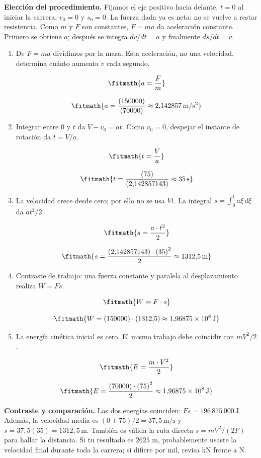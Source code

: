 \noindent\textbf{Elección del procedimiento.} Fijamos el eje positivo hacia delante, $t=0$ al iniciar la carrera, $v_0=0$ y $s_0=0$. La fuerza dada ya es neta: no se vuelve a restar resistencia. Como $m$ y $F$ son constantes, $F=ma$ da aceleración constante. Primero se obtiene $a$; después se integra $dv/dt=a$ y finalmente $ds/dt=v$.

\begin{enumerate}

\item De $F=ma$ dividimos por la masa. Esta aceleración, no una velocidad, determina cuánto aumenta $v$ cada segundo.

\[\fitmath{a=\frac{F}{m}}\]

\[\fitmath{a=\frac{(150000)}{(70000)}\approx 2{,}142857\,\mathrm{m/s^{2}}}\]

\item Integrar entre $0$ y $t$ da $V-v_0=at$. Como $v_0=0$, despejar el instante de rotación da $t=V/a$.

\[\fitmath{t=\frac{V}{a}}\]

\[\fitmath{t=\frac{(75)}{(2{,}142857143)}\approx 35\,\mathrm{s}}\]

\item La velocidad crece desde cero; por ello no se usa $Vt$. La integral $s=\int_0^t a\xi\,d\xi$ da $at^2/2$.

\[\fitmath{s=\frac{a\cdot {t}^{2}}{2}}\]

\[\fitmath{s=\frac{(2{,}142857143)\cdot {(35)}^{2}}{2}\approx 1312{,}5\,\mathrm{m}}\]

\item Contraste de trabajo: una fuerza constante y paralela al desplazamiento realiza $W=Fs$.

\[\fitmath{W=F\cdot s}\]

\[\fitmath{W=(150000)\cdot (1312{,}5)\approx 1{,}96875\times10^{8}\,\mathrm{J}}\]

\item La energía cinética inicial es cero. El mismo trabajo debe coincidir con $mV^2/2$.

\[\fitmath{E=\frac{m\cdot {V}^{2}}{2}}\]

\[\fitmath{E=\frac{(70000)\cdot {(75)}^{2}}{2}\approx 1{,}96875\times10^{8}\,\mathrm{J}}\]

\end{enumerate}

\noindent\textbf{Contraste y comparación.} Las dos energías coinciden: $Fs=196\,875\,000\,\mathrm{J}$. Además, la velocidad media es $(0+75)/2=37{,}5\,\mathrm{m/s}$ y $s=37{,}5(35)=1312{,}5\,\mathrm m$. También es válida la ruta directa $s=mV^2/(2F)$ para hallar la distancia. Si tu resultado es $2625$ m, probablemente usaste la velocidad final durante toda la carrera; si difiere por mil, revisa kN frente a N.
